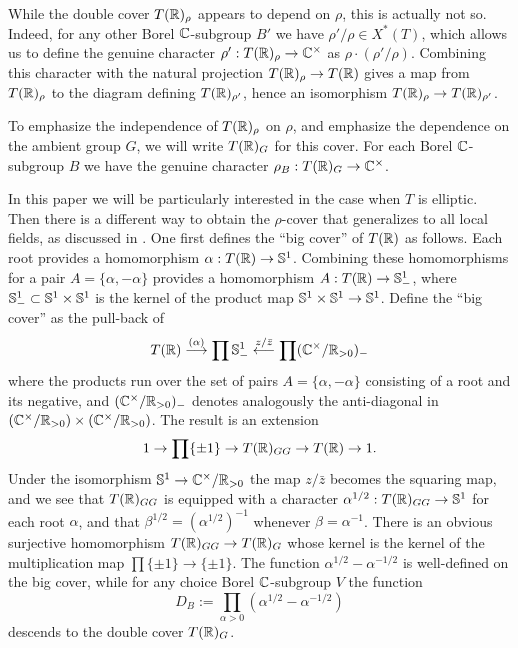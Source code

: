 \documentclass{article}
\theoremstyle{definition}
\numberwithin{equation}{section}
\renewcommand{\-}{\hyp{}}
\begin{document}
While the double cover $T(\mathbb{R})_\rho$ appears to depend on $\rho$, this is actually not so. Indeed, for any other Borel $\mathbb{C}$-subgroup $B'$ we have $\rho'/\rho \in X^*(T)$, which allows us to define the genuine character $\rho' : T(\mathbb{R})_\rho \to \mathbb{C}^\times$ as $\rho \cdot (\rho'/\rho)$. Combining this character with the natural projection $T(\mathbb{R})_\rho \to T(\mathbb{R})$ gives a map from $T(\mathbb{R})_\rho$ to the diagram defining $T(\mathbb{R})_{\rho'}$, hence an isomorphism $T(\mathbb{R})_\rho \to T(\mathbb{R})_{\rho'}$.

To emphasize the independence of $T(\mathbb{R})_\rho$ on $\rho$, and emphasize the dependence on the ambient group $G$, we will write $T(\mathbb{R})_G$ for this cover. For each Borel $\mathbb{C}$-subgroup $B$ we have the genuine character $\rho_B : T(\mathbb{R})_G \to \mathbb{C}^\times$.

In this paper we will be particularly interested in the case when $T$ is elliptic. Then there is a different way to obtain the $\rho$-cover that generalizes to all local fields, as discussed in \cite{KalDC}. One first defines the ``big cover'' of $T(\mathbb{R})$ as follows. Each root provides a homomorphism $\alpha : T(\mathbb{R}) \to \mathbb{S}^1$. Combining these homomorphisms for a pair $A=\{\alpha,-\alpha\}$ provides a homomorphism $A : T(\mathbb{R}) \to \mathbb{S}^1_-$, where $\mathbb{S}^1_- \subset \mathbb{S}^1 \times \mathbb{S}^1$ is the kernel of the product map $\mathbb{S}^1 \times \mathbb{S}^1 \to \mathbb{S}^1$. Define the ``big cover'' as the pull-back of
\begin{equation} \label{eq:bigcover}
T(\mathbb{R}) \stackrel{(\alpha)}{\longrightarrow} \prod \mathbb{S}^1_- \stackrel{z/\bar z}{\longleftarrow} \prod(\mathbb{C}^\times/\mathbb{R}_{>0})_-
\end{equation}
where the products run over the set of pairs $A=\{\alpha,-\alpha\}$ consisting of a root and its negative, and $(\mathbb{C}^\times/\mathbb{R}_{>0})_-$ denotes analogously the anti-diagonal in $(\mathbb{C}^\times/\mathbb{R}_{>0}) \times (\mathbb{C}^\times/\mathbb{R}_{>0})$. The result is an extension
\[ 1 \to \prod\{\pm1\} \to T(\mathbb{R})_{GG} \to T(\mathbb{R}) \to 1. \]
Under the isomorphism $\mathbb{S}^1 \to \mathbb{C}^\times/\mathbb{R}_{>0}$ the map $z/\bar z$ becomes the squaring map, and we see that $T(\mathbb{R})_{GG}$ is equipped with a character $\alpha^{1/2} : T(\mathbb{R})_{GG} \to \mathbb{S}^1$ for each root $\alpha$, and that $\beta^{1/2}=(\alpha^{1/2})^{-1}$ whenever $\beta=\alpha^{-1}$. There is an obvious surjective homomorphism $T(\mathbb{R})_{GG} \to T(\mathbb{R})_G$ whose kernel is the kernel of the multiplication map $\prod\{\pm1\} \to \{\pm1\}$. The function $\alpha^{1/2}-\alpha^{-1/2}$ is well-defined on the big cover, while for any choice Borel $\mathbb{C}$-subgroup $V$ the function
\[ D_B := \prod_{\alpha>0}(\alpha^{1/2}-\alpha^{-1/2}) \]
descends to the double cover $T(\mathbb{R})_G$.
\end{document}

